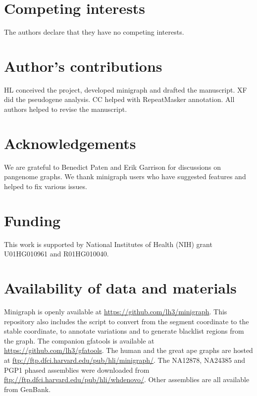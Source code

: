 \documentclass[twocolumn]{bmcart}
\begin{document}
\begin{backmatter}

\section*{Competing interests}
The authors declare that they have no competing interests.

\section*{Author's contributions}
HL conceived the project, developed minigraph and drafted the manuscript.
XF did the pseudogene analysis. CC helped with RepeatMasker annotation.
All authors helped to revise the manuscript.

\section*{Acknowledgements}
We are grateful to Benedict Paten and Erik Garrison for discussions on
pangenome graphs. We thank minigraph users who have suggested features and
helped to fix various issues.

\section*{Funding}
This work is supported by National Institutes of Health (NIH) grant
U01HG010961 and R01HG010040.

\section*{Availability of data and materials}
Minigraph is openly available at
\href{https://github.com/lh3/minigraph}{https://github.com/lh3/minigraph}.
This repository also includes the script to convert from the segment coordinate
to the stable coordinate, to annotate variations and to generate blacklist
regions from the graph. The companion gfatools is available at
\href{https://github.com/lh3/gfatols}{https://github.com/lh3/gfatools}. The
human and the great ape graphs are hosted at
\href{ftp://ftp.dfci.harvard.edu/pub/hli/minigraph/}{ftp://ftp.dfci.harvard.edu/pub/hli/minigraph/}.
The NA12878, NA24385 and PGP1 phased assemblies were downloaded from
\href{ftp://ftp.dfci.harvard.edu/pub/hli/whdenovo/}{ftp://ftp.dfci.harvard.edu/pub/hli/whdenovo/}.
Other assemblies are all available from GenBank.






\end{backmatter}
\end{document}
